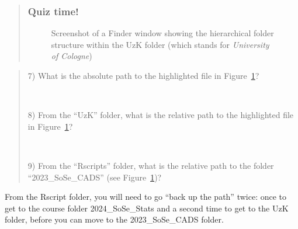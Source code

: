 \documentclass[
  letterpaper,
  DIV=11,
  numbers=noendperiod]{scrreprt}
\begin{document}
\begin{quote}
\subsubsection*{Quiz time!}\label{quiz-time-2}

\begin{figure}


\caption{\label{fig-FinderWindowPath}Screenshot of a Finder window
showing the hierarchical folder structure within the UzK folder (which
stands for \emph{University of Cologne})}

\end{figure}%
\end{quote}

\begin{quote}
7) What is the absolute path to the highlighted file in
Figure~\ref{fig-FinderWindowPath}?

~

8) From the ``UzK'' folder, what is the relative path to the highlighted
file in Figure~\ref{fig-FinderWindowPath}?

~

9) From the ``Rscripts'' folder, what is the relative path to the folder
``2023\_SoSe\_CADS'' (see Figure~\ref{fig-FinderWindowPath})?
\end{quote}

From the Rscript folder, you will need to go ``back up the path'' twice:
once to get to the course folder 2024\_SoSe\_Stats and a second time to
get to the UzK folder, before you can move to the 2023\_SoSe\_CADS
folder.
\end{document}

